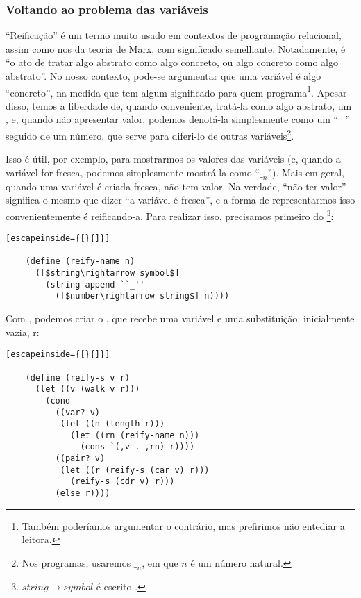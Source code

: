   \subsubsection{Voltando ao problema das variáveis}

  ``Reificação'' é um termo muito usado em contextos de programação
  relacional, assim como nos da teoria de Marx, com significado
  semelhante. Notadamente, é ``o ato de tratar algo abstrato como algo
  concreto, ou algo concreto como algo abstrato''. No nosso contexto,
  pode-se argumentar que uma variável é algo ``concreto'', na medida
  que tem algum significado para quem programa\footnote{Também
    poderíamos argumentar o contrário, mas prefirimos não entediar a
    leitora.}. Apesar disso, temos a liberdade de, quando conveniente,
  tratá-la como algo abstrato, um , e, quando
  não apresentar valor, podemos denotá-la simplesmente como um ``\_''
  seguido de um número, que serve para diferi-lo de outras
  variáveis\footnote{Nos programas, usaremos $\__n$, em que $n$ é um
    número natural.}.

  Isso é útil, por exemplo, para mostrarmos os valores das variáveis
  (e, quando a variável for fresca, podemos simplesmente mostrá-la
  como ``$\__n$''). Mais em geral, quando uma variável é criada
  fresca, não tem valor. Na verdade, ``não ter valor'' significa o
  mesmo que dizer ``a variável é fresca'', e a forma de representarmos
  isso convenientemente é reificando-a. Para realizar isso, precisamos
  primeiro do \footnote{$string\rightarrow symbol$ é escrito
    .}:

  \begin{lstlisting}[escapeinside={[}{]}]

    (define (reify-name n)
      ([$string\rightarrow symbol$]
        (string-append ``_''
          ([$number\rightarrow string$] n))))

  \end{lstlisting}

  Com , podemos criar o , que
  recebe uma variável e uma substituição, inicialmente vazia, r:

  \begin{lstlisting}[escapeinside={[}{]}]

    (define (reify-s v r)
      (let ((v (walk v r)))
        (cond
          ((var? v)
           (let ((n (length r)))
             (let ((rn (reify-name n)))
               (cons `(,v . ,rn) r))))
          ((pair? v)
           (let ((r (reify-s (car v) r)))
             (reify-s (cdr v) r)))
          (else r))))

  \end{lstlisting}

